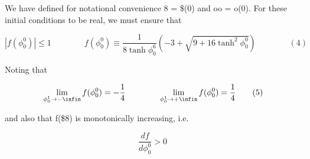 \documentclass{article}
\begin{document}
We have defined for notational convenience 8 = \$(0) and oo = o(0). For these initial
conditions to be real, we must ensure that


\begin{equation}
| f ( \phi _ { 0 } ^ { 0 } ) | \leq 1 \qquad \qquad f ( \phi _ { 0 } ^ { 0 } ) \equiv \frac { 1 } { 8 \operatorname { t a n h } \phi _ { 0 } ^ { 6 } } \left ( - 3 + \sqrt { 9 + 1 6 \operatorname { t a n h } ^ { 2 } \phi _ { 0 } ^ { 0 } } \right ) \qquad \qquad ( 4 )
\end{equation}


Noting that


\begin{equation}
\operatorname * { l i m } _ { \phi _ { 0 } ^ { 1 } \rightarrow - \infin } f ( \phi _ { 0 } ^ { 0 } ) = - \frac { 1 } { 4 } \qquad \qquad \operatorname * { l i m } _ { \phi _ { 0 } ^ { 1 } \rightarrow + \infin } f ( \phi _ { 0 } ^ { 0 } ) = \frac { 1 } { 4 } \qquad ( 5 )
\end{equation}


and also that f(\$8) is monotonically increasing, i.e.


\begin{equation}
\frac { d f } { d \phi _ { 0 } ^ { 0 } } > 0 ~
\end{equation}
\end{document}
